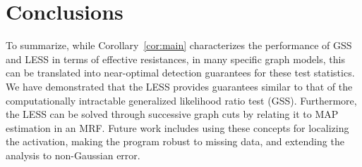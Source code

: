 \section{Conclusions}
\vspace{-.2cm}
To summarize, while Corollary~\ref{cor:main} characterizes the performance of GSS and LESS in terms of effective resistances, in many specific graph models, this can be translated into near-optimal detection guarantees for these test statistics.
We have demonstrated that the LESS provides guarantees similar to that of the computationally intractable generalized likelihood ratio test (GSS).
Furthermore, the LESS can be solved through successive graph cuts by relating it to MAP estimation in an MRF.
Future work includes using these concepts for localizing the activation, making the program robust to missing data, and extending the analysis to non-Gaussian error.
\vspace{-.2cm}


